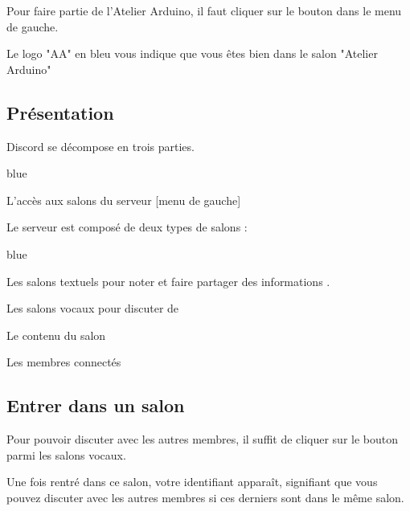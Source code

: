 Pour faire partie de l'Atelier Arduino, il faut cliquer sur le bouton  dans le menu de gauche. \\



Le logo "AA" en bleu vous indique que vous êtes bien dans le salon "Atelier Arduino"


\subsection{Présentation}

Discord se décompose en trois parties. 

\begin{items}{blue}{\Triangle}
	\item L'accès aux salons du serveur [menu de gauche]


	Le serveur est composé de deux types de salons : 

	\begin{items}{blue}{\Bullet}
		\item Les salons textuels pour noter et faire partager des informations .
		\item Les salons vocaux pour discuter de 
	\end{items}


	\item Le contenu du salon
	\item Les membres connectés
\end{items}



\subsection{Entrer dans un salon}

Pour pouvoir discuter avec les autres membres, il suffit de cliquer sur le bouton  parmi les salons vocaux.


Une fois rentré dans ce salon, votre identifiant apparaît, signifiant que vous pouvez discuter avec les autres membres si ces derniers sont dans le même salon.

